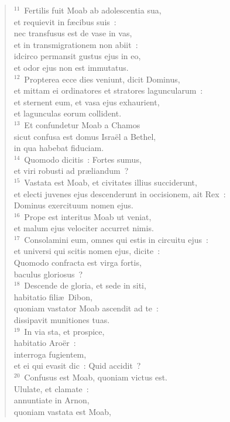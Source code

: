 \begin{flushleft}
\begin{verse}
${}^{11}$~Fertilis fuit Moab ab adolescentia sua,\\ et requievit in f\ae cibus suis~:\\ nec transfusus est de vase in vas,\\ et in transmigrationem non abiit~:\\ idcirco permansit gustus ejus in eo,\\ et odor ejus non est immutatus.\\
${}^{12}$~Propterea ecce dies veniunt, dicit Dominus,\\ et mittam ei ordinatores et stratores laguncularum~:\\ et sternent eum, et vasa ejus exhaurient,\\ et lagunculas eorum collident.\\
${}^{13}$~Et confundetur Moab a Chamos\\ sicut confusa est domus Isra\"el a Bethel,\\ in qua habebat fiduciam.\\
${}^{14}$~Quomodo dicitis~: Fortes sumus,\\ et viri robusti ad pr\ae liandum~?\\
${}^{15}$~Vastata est Moab, et civitates illius succiderunt,\\ et electi juvenes ejus descenderunt in occisionem, ait Rex~:\\ Dominus exercituum nomen ejus.\\
${}^{16}$~Prope est interitus Moab ut veniat,\\ et malum ejus velociter accurret nimis.\\
${}^{17}$~Consolamini eum, omnes qui estis in circuitu ejus~:\\ et universi qui scitis nomen ejus, dicite~:\\ Quomodo confracta est virga fortis,\\ baculus gloriosus~?\\
${}^{18}$~Descende de gloria, et sede in siti,\\ habitatio fili\ae\ Dibon,\\ quoniam vastator Moab ascendit ad te~:\\ dissipavit munitiones tuas.\\
${}^{19}$~In via sta, et prospice,\\ habitatio Aro\"er~:\\ interroga fugientem,\\ et ei qui evasit dic~: Quid accidit~?\\
${}^{20}$~Confusus est Moab, quoniam victus est.\\ Ululate, et clamate~:\\ annuntiate in Arnon,\\ quoniam vastata est Moab,\\

\end{verse}
\end{flushleft}
